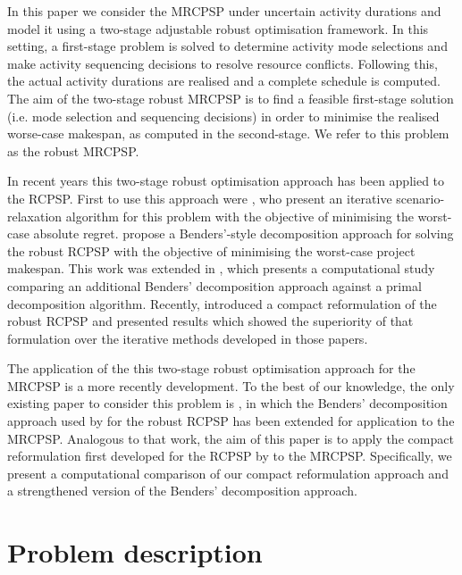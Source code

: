 \documentclass[a4paper,abstracton]{scrartcl}
\begin{document}
In this paper we consider the MRCPSP under uncertain activity durations and model it using a two-stage adjustable robust optimisation framework. In this setting, a first-stage problem is solved to determine activity mode selections and make activity sequencing decisions to resolve resource conflicts. Following this, the actual activity durations are realised and a complete schedule is computed. The aim of the two-stage robust MRCPSP is to find a feasible first-stage solution (i.e. mode selection and sequencing decisions) in order to minimise the realised worse-case makespan, as computed in the second-stage. We refer to this problem as the robust MRCPSP.

In recent years this two-stage robust optimisation approach has been applied to the RCPSP. First to use this approach were \cite{artigues2013robust}, who present an iterative scenario-relaxation algorithm for this problem with the objective of minimising the worst-case absolute regret. \cite{bruni2017adjustable} propose a Benders'-style decomposition approach for solving the robust RCPSP with the objective of minimising the worst-case project makespan. This work was extended in \cite{bruni2018computational}, which presents a computational study comparing an additional Benders' decomposition approach against a primal decomposition algorithm. Recently, \cite{bold2021compact} introduced a compact reformulation of the robust RCPSP and presented results which showed the superiority of that formulation over the iterative methods developed in those papers. 

The application of the this two-stage robust optimisation approach for the MRCPSP is a more recently development. To the best of our knowledge, the only existing paper to consider this problem is \cite{balouka2021robust}, in which the Benders' decomposition approach used by \cite{bruni2017adjustable} for the robust RCPSP has been extended for application to the MRCPSP. Analogous to that work, the aim of this paper is to apply the compact reformulation first developed for the RCPSP by \cite{bold2021compact} to the MRCPSP. Specifically, we present a computational comparison of our compact reformulation approach and a strengthened version of the Benders' decomposition approach.

\section{Problem description}
\end{document}
